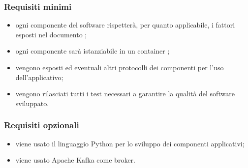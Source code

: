 		\subsubsection{Requisiti minimi}
            \begin{itemize}
                \item ogni componente del software rispetterà, per quanto applicabile, i fattori esposti nel documento ;
                \item ogni componente sarà istanziabile in un container ;
                \item vengono esposti  ed eventuali altri protocolli dei componenti per l'uso dell'applicativo;
                \item vengono rilasciati tutti i test necessari a garantire la qualità del software sviluppato.
            \end{itemize}
	
		\subsubsection{Requisiti opzionali}
		    \begin{itemize}
                \item viene usato il linguaggio Python per lo sviluppo dei componenti applicativi;
                \item viene usato Apache Kafka come broker.
            \end{itemize}
